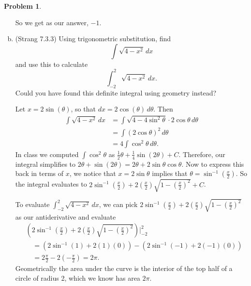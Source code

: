 \documentclass[11pt,oneside]{amsart}
\theoremstyle{definition}
\newtheorem{problem}{Problem}
\begin{document}
\begin{problem}
\begin{enumerate}[(a)]
\begin{solution}
                So we get as our answer, $-1$.
            \end{solution}
            \item (Strang 7.3.3) Using trigonometric substitution, find
            \[\int\sqrt{4-x^2}\,dx\]
            and use this to calculate
            \[\int_{-2}^2\sqrt{4-x^2}\,dx.\]
            Could you have found this definite integral using geometry instead?
            \begin{solution}
                Let $x=2\sin(\theta)$, so that $dx=2\cos(\theta)\,d\theta$. Then
                \[\begin{split}
                    \int\sqrt{4-x^2}\,dx &= \int\sqrt{4-4\sin^2\theta}\cdot 2\cos\theta\,d\theta\\
                    &= \int (2\cos\theta)^2\,d\theta\\
                    &= 4\int\cos^2\theta\,d\theta.
                \end{split}\]
                In class we computed $\int\cos^2\theta$ as $\frac 12\theta+\frac 14\sin(2\theta)+C$. Therefore, our integral simplifies to $2\theta+\sin(2\theta)=2\theta+2\sin\theta\cos\theta$. Now to express this back in terms of $x$, we notice that $x=2\sin\theta$ implies that $\theta=\sin^{-1}(\frac x2)$. So the integral evaluates to $2\sin^{-1}(\frac x2)+2 (\frac x2)\sqrt{1-(\frac x2)^2}+C$.

                To evaluate $\int_{-2}^2\sqrt{4-x^2}\,dx$, we can pick $2\sin^{-1}(\frac x2)+2 (\frac x2)\sqrt{1-(\frac x2)^2}$ as our antiderivative and evaluate
                \[\begin{split}
                    &\left(2\sin^{-1}\left(\frac x2\right) +2 \left(\frac x2\right)\sqrt{1-\left(\frac x2\right)^2}\right)\Big|_{-2}^2
                    \\
                    &\quad= (2\sin^{-1}(1)+2(1)(0))-(2\sin^{-1}(-1)+2(-1)(0))\\
                    &\quad= 2\frac{\pi}2-2\left(-\frac{\pi}2\right)=2\pi.
                \end{split}\]
                Geometrically the area under the curve is the interior of the top half of a circle of radius 2, which we know has area $2\pi$.
            \end{solution}
        \end{enumerate}
    \end{problem}
\end{document}
